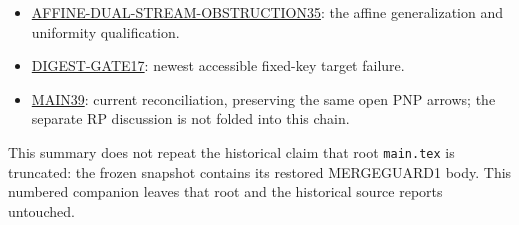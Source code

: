 \documentclass[11pt]{article}
\begin{document}
\begin{itemize}
\item \href{https://github.com/j15marti/pnp/blob/b3ea46290587fcaea559552ed899f942f956b327/research/main/2026-10-21_0748_MAIN_AFFINE_DUAL_STREAM_OBSTRUCTION35.tex}{AFFINE-DUAL-STREAM-OBSTRUCTION35}: the affine generalization and uniformity qualification.
\item \href{https://github.com/j15marti/pnp/blob/b3ea46290587fcaea559552ed899f942f956b327/research/agents/proof/2026-10-21_1000_DIGEST_GATE17_handoff.md}{DIGEST-GATE17}: newest accessible fixed-key target failure.
\item \href{https://github.com/j15marti/pnp/blob/b3ea46290587fcaea559552ed899f942f956b327/research/main/2026-10-21_1148_MAIN_RP_LINEAR_HITTING_TIGHTNESS39.md}{MAIN39}: current reconciliation, preserving the same open PNP arrows; the separate RP discussion is not folded into this chain.
\end{itemize}
This summary does not repeat the historical claim that root
\texttt{main.tex} is truncated: the frozen snapshot contains its restored
MERGEGUARD1 body. This numbered companion leaves that root and the
historical source reports untouched.

\end{document}

